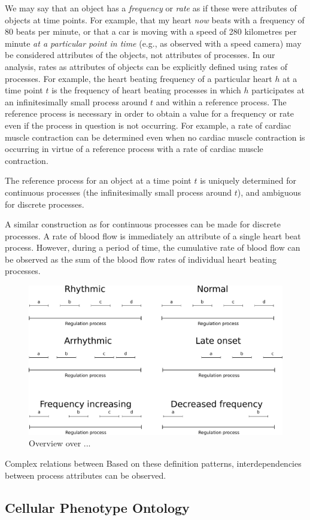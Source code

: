 \documentclass{bioinfo}
\begin{document}
We may say that an object has a {\em frequency} or {\em rate} as if
these were attributes of objects at time points. For example, that my
heart {\em now} beats with a frequency of 80 beats per minute, or that
a car is moving with a speed of 280 kilometres per minute {\em at a
  particular point in time} (e.g., as observed with a speed camera)
may be considered attributes of the objects, not attributes of
processes. In our analysis, rates as attributes of objects can be
explicitly defined using rates of processes. For example, the heart
beating frequency of a particular heart $h$ at a time point $t$ is the
frequency of heart beating processes in which $h$ participates at an
infinitesimally small process around $t$ and within a reference
process. The reference process is necessary in order to obtain a value
for a frequency or rate even if the process in question is not
occurring. For example, a rate of cardiac muscle contraction can be
determined even when no cardiac muscle contraction is occurring in
virtue of a reference process with a rate of cardiac muscle
contraction.

The reference process for an object at a time point $t$ is uniquely
determined for continuous processes (the infinitesimally small process
around $t$), and ambiguous for discrete processes.


A similar construction as for continuous processes can be made for
discrete processes. A rate of blood flow is immediately an attribute
of a single heart beat process. However, during a period of time, the
cumulative rate of blood flow can be observed as the sum of the blood
flow rates of individual heart beating processes.

\begin{figure}
  \centering
  \includegraphics[width=.5\textwidth]{processpatterns.pdf}
  \caption{Overview over ...\label{fig:patterns}}
\end{figure}

Complex relations between Based on these definition patterns,
interdependencies between process attributes can be observed.


\subsection{Cellular Phenotype Ontology}
\end{document}
